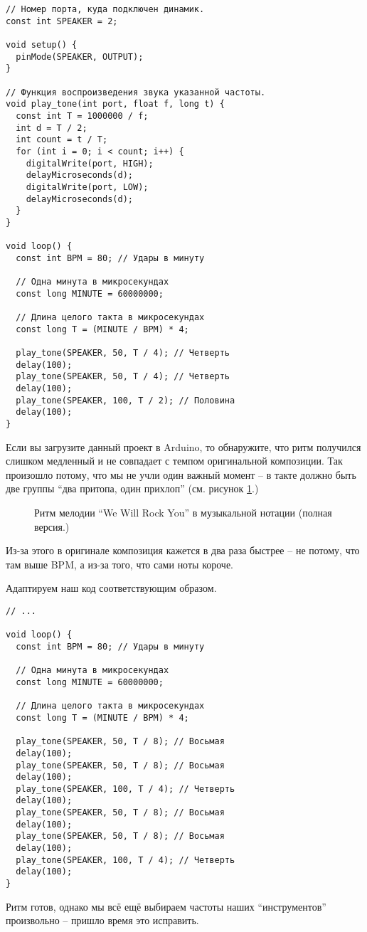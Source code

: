 \documentclass[../sparc.tex]{subfiles}
\begin{document}
\begin{verbatim}
// Номер порта, куда подключен динамик.
const int SPEAKER = 2;

void setup() {
  pinMode(SPEAKER, OUTPUT);
}

// Функция воспроизведения звука указанной частоты.
void play_tone(int port, float f, long t) {
  const int T = 1000000 / f;
  int d = T / 2;
  int count = t / T;
  for (int i = 0; i < count; i++) {
    digitalWrite(port, HIGH);
    delayMicroseconds(d);
    digitalWrite(port, LOW);
    delayMicroseconds(d);
  }
}

void loop() {
  const int BPM = 80; // Удары в минуту

  // Одна минута в микросекундах
  const long MINUTE = 60000000;

  // Длина целого такта в микросекундах
  const long T = (MINUTE / BPM) * 4;

  play_tone(SPEAKER, 50, T / 4); // Четверть
  delay(100);
  play_tone(SPEAKER, 50, T / 4); // Четверть
  delay(100);
  play_tone(SPEAKER, 100, T / 2); // Половина
  delay(100);
}
\end{verbatim}

Если вы загрузите данный проект в Arduino, то обнаружите, что ритм получился
слишком медленный и не совпадает с темпом оригинальной композиции. Так произошло
потому, что мы не учли один важный момент -- в такте должно быть две группы ``два
притопа, один прихлоп'' (см. рисунок \ref{fig:lilypond-queen-2}.)

\begin{figure}[ht]
  \centering
  \caption{Ритм мелодии ``We Will Rock You'' в музыкальной нотации (полная версия.)}
  \label{fig:lilypond-queen-2}
\end{figure}

Из-за этого в оригинале композиция кажется в два раза быстрее -- не потому, что
там выше BPM, а из-за того, что сами ноты короче.

Адаптируем наш код соответствующим образом.

\begin{verbatim}
// ...

void loop() {
  const int BPM = 80; // Удары в минуту

  // Одна минута в микросекундах
  const long MINUTE = 60000000;

  // Длина целого такта в микросекундах
  const long T = (MINUTE / BPM) * 4;

  play_tone(SPEAKER, 50, T / 8); // Восьмая
  delay(100);
  play_tone(SPEAKER, 50, T / 8); // Восьмая
  delay(100);
  play_tone(SPEAKER, 100, T / 4); // Четверть
  delay(100);
  play_tone(SPEAKER, 50, T / 8); // Восьмая
  delay(100);
  play_tone(SPEAKER, 50, T / 8); // Восьмая
  delay(100);
  play_tone(SPEAKER, 100, T / 4); // Четверть
  delay(100);
}
\end{verbatim}

Ритм готов, однако мы всё ещё выбираем частоты наших ``инструментов''
произвольно -- пришло время это исправить.
\end{document}
